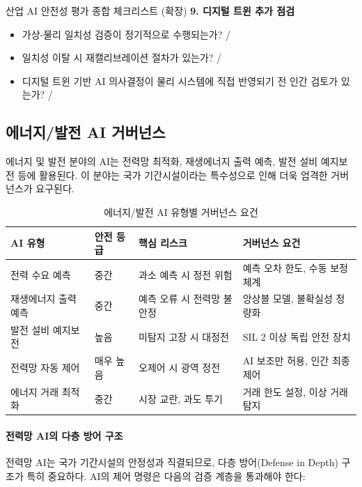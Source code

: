 \begin{practicaltool}{산업 AI 안전성 평가 종합 체크리스트 (확장)}
\textbf{9. 디지털 트윈 추가 점검}
\begin{itemize}
    \item 가상-물리 일치성 검증이 정기적으로 수행되는가? \checkmark / \texttimes
    \item 일치성 이탈 시 재캘리브레이션 절차가 있는가? \checkmark / \texttimes
    \item 디지털 트윈 기반 AI 의사결정이 물리 시스템에 직접 반영되기 전 인간 검토가 있는가? \checkmark / \texttimes
\end{itemize}
\end{practicaltool}

\subsection{에너지/발전 AI 거버넌스}
\label{sec:19.4.3}

에너지 및 발전 분야의 AI는 전력망 최적화, 재생에너지 출력 예측, 발전 설비 예지보전 등에 활용된다. 이 분야는 국가 기간시설이라는 특수성으로 인해 더욱 엄격한 거버넌스가 요구된다.

\begin{table}[htbp]
\centering
\caption{에너지/발전 AI 유형별 거버넌스 요건}
\label{tab:19_energy}
\begin{tabularx}{\textwidth}{p{3cm}p{2cm}Xp{3cm}}
\toprule
\textbf{AI 유형} & \textbf{안전 등급} & \textbf{핵심 리스크} & \textbf{거버넌스 요건} \\
\midrule
전력 수요 예측 & 중간 & 과소 예측 시 정전 위험 & 예측 오차 한도, 수동 보정 체계 \\
재생에너지 출력 예측 & 중간 & 예측 오류 시 전력망 불안정 & 앙상블 모델, 불확실성 정량화 \\
발전 설비 예지보전 & 높음 & 미탐지 고장 시 대정전 & SIL 2 이상 독립 안전 장치 \\
전력망 자동 제어 & 매우 높음 & 오제어 시 광역 정전 & AI 보조만 허용, 인간 최종 제어 \\
에너지 거래 최적화 & 중간 & 시장 교란, 과도 투기 & 거래 한도 설정, 이상 거래 탐지 \\
\bottomrule
\end{tabularx}
\end{table}

\paragraph{전력망 AI의 다층 방어 구조}

전력망 AI는 국가 기간시설의 안정성과 직결되므로, 다층 방어(Defense in Depth) 구조가 특히 중요하다. AI의 제어 명령은 다음의 검증 계층을 통과해야 한다:

